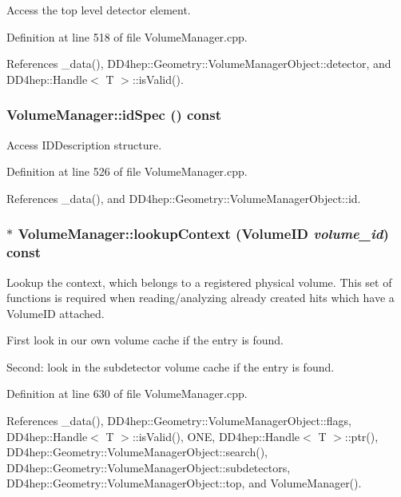 Access the top level detector element. 

Definition at line 518 of file VolumeManager.cpp.

References \_\-data(), DD4hep::Geometry::VolumeManagerObject::detector, and DD4hep::Handle$<$ T $>$::isValid().\hypertarget{class_d_d4hep_1_1_geometry_1_1_volume_manager_a9a972916fb9871361da60077f80c9ef7}{
\subsubsection[{idSpec}]{ VolumeManager::idSpec () const}}
\label{class_d_d4hep_1_1_geometry_1_1_volume_manager_a9a972916fb9871361da60077f80c9ef7}


Access IDDescription structure. 

Definition at line 526 of file VolumeManager.cpp.

References \_\-data(), and DD4hep::Geometry::VolumeManagerObject::id.\hypertarget{class_d_d4hep_1_1_geometry_1_1_volume_manager_ae79db756ac5864d0f36bb61e09c95e70}{
\subsubsection[{lookupContext}]{ $\ast$ VolumeManager::lookupContext ({\bf VolumeID} {\em volume\_\-id}) const}}
\label{class_d_d4hep_1_1_geometry_1_1_volume_manager_ae79db756ac5864d0f36bb61e09c95e70}


Lookup the context, which belongs to a registered physical volume. This set of functions is required when reading/analyzing already created hits which have a VolumeID attached. 

First look in our own volume cache if the entry is found.

Second: look in the subdetector volume cache if the entry is found. 

Definition at line 630 of file VolumeManager.cpp.

References \_\-data(), DD4hep::Geometry::VolumeManagerObject::flags, DD4hep::Handle$<$ T $>$::isValid(), ONE, DD4hep::Handle$<$ T $>$::ptr(), DD4hep::Geometry::VolumeManagerObject::search(), DD4hep::Geometry::VolumeManagerObject::subdetectors, DD4hep::Geometry::VolumeManagerObject::top, and VolumeManager().

